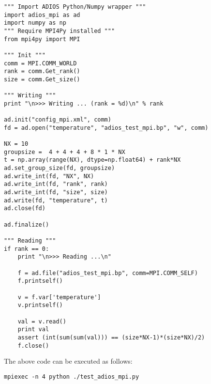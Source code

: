 \begin{lstlisting}[language=ADIOS-python,caption={A Python/Numpy example for parallel writing/reading ADIOS BP file},label={},]
""" Import ADIOS Python/Numpy wrapper """
import adios_mpi as ad
import numpy as np
""" Require MPI4Py installed """
from mpi4py import MPI

""" Init """
comm = MPI.COMM_WORLD
rank = comm.Get_rank()
size = comm.Get_size()

""" Writing """
print "\n>>> Writing ... (rank = %d)\n" % rank

ad.init("config_mpi.xml", comm)
fd = ad.open("temperature", "adios_test_mpi.bp", "w", comm)

NX = 10
groupsize =  4 + 4 + 4 + 8 * 1 * NX
t = np.array(range(NX), dtype=np.float64) + rank*NX
ad.set_group_size(fd, groupsize)
ad.write_int(fd, "NX", NX)
ad.write_int(fd, "rank", rank)
ad.write_int(fd, "size", size)
ad.write(fd, "temperature", t)
ad.close(fd)

ad.finalize()

""" Reading """
if rank == 0:
    print "\n>>> Reading ...\n"

    f = ad.file("adios_test_mpi.bp", comm=MPI.COMM_SELF)
    f.printself()

    v = f.var['temperature']
    v.printself()

    val = v.read()
    print val
    assert (int(sum(sum(val))) == (size*NX-1)*(size*NX)/2)
    f.close()

\end{lstlisting}

The above code can be executed as follows:
\begin{lstlisting}
mpiexec -n 4 python ./test_adios_mpi.py
\end{lstlisting}
